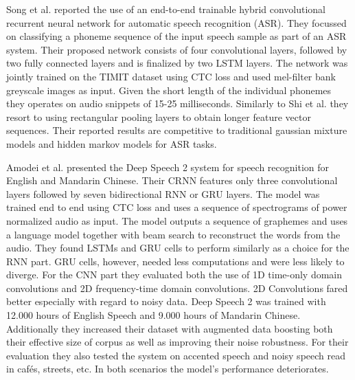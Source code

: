 Song et al.\cite{song2015end} reported the use of an end-to-end trainable hybrid convolutional recurrent neural network for automatic speech recognition (ASR). They focussed on classifying a phoneme sequence of the input speech sample as part of an ASR system. Their proposed network consists of four convolutional layers, followed by two fully connected layers and is finalized by two LSTM layers. The network was jointly trained on the TIMIT dataset using CTC loss and used mel-filter bank greyscale images as input. Given the short length of the individual phonemes they operates on audio snippets of 15-25 milliseconds. Similarly to Shi et al.\cite{shi2016end} they resort to using rectangular pooling layers to obtain longer feature vector sequences. Their reported results are competitive to traditional gaussian mixture models and hidden markov models for ASR tasks. 

Amodei et al.\cite{amodei2015deep} presented the Deep Speech 2 system for speech recognition for English and Mandarin Chinese. Their CRNN features only three convolutional layers followed by seven bidirectional RNN or GRU layers. The model was trained end to end using CTC loss and uses a sequence of spectrograms of power normalized audio as input. The model outputs a sequence of graphemes and uses a language model together with beam search to reconstruct the words from the audio. They found LSTMs and GRU cells to perform similarly as a choice for the RNN part. GRU cells, however, needed less computations and were less likely to diverge. For the CNN part they evaluated both the use of 1D time-only domain convolutions and 2D frequency-time domain convolutions. 2D Convolutions fared better especially with regard to noisy data. 
Deep Speech 2 was trained with 12.000 hours of English Speech and 9.000 hours of Mandarin Chinese. Additionally they increased their dataset with augmented data boosting both their effective size of corpus as well as improving their noise robustness. For their evaluation they also tested the system on accented speech and noisy speech read in cafés, streets, etc. In both scenarios the model's performance deteriorates.

